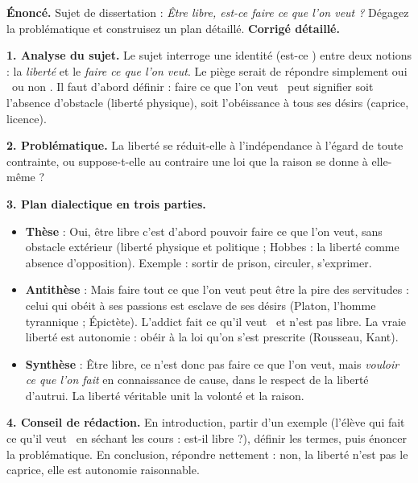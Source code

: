 \documentclass[11pt]{article}
\begin{document}
\begin{exoresolu}
\textbf{Énoncé.} Sujet de dissertation : \emph{Être libre, est-ce faire ce que l'on veut ?} Dégagez la problématique et construisez un plan détaillé.
\tcblower
\textbf{Corrigé détaillé.}

\textbf{1. Analyse du sujet.} Le sujet interroge une identité (\guillemotleft est-ce \guillemotright) entre deux notions : la \emph{liberté} et le \emph{faire ce que l'on veut}. Le piège serait de répondre simplement \guillemotleft oui \guillemotright\ ou \guillemotleft non \guillemotright. Il faut d'abord définir : \guillemotleft faire ce que l'on veut \guillemotright\ peut signifier soit l'absence d'obstacle (liberté physique), soit l'obéissance à tous ses désirs (caprice, licence).

\textbf{2. Problématique.} La liberté se réduit-elle à l'indépendance à l'égard de toute contrainte, ou suppose-t-elle au contraire une loi que la raison se donne à elle-même ?

\textbf{3. Plan dialectique en trois parties.}
\begin{itemize}
\item \textbf{Thèse} : Oui, être libre c'est d'abord pouvoir faire ce que l'on veut, sans obstacle extérieur (liberté physique et politique ; Hobbes : la liberté comme absence d'opposition). Exemple : sortir de prison, circuler, s'exprimer.
\item \textbf{Antithèse} : Mais faire tout ce que l'on veut peut être la pire des servitudes : celui qui obéit à ses passions est esclave de ses désirs (Platon, l'homme tyrannique ; Épictète). L'addict \guillemotleft fait ce qu'il veut \guillemotright\ et n'est pas libre. La vraie liberté est autonomie : obéir à la loi qu'on s'est prescrite (Rousseau, Kant).
\item \textbf{Synthèse} : Être libre, ce n'est donc pas faire ce que l'on veut, mais \emph{vouloir ce que l'on fait} en connaissance de cause, dans le respect de la liberté d'autrui. La liberté véritable unit la volonté et la raison.
\end{itemize}

\textbf{4. Conseil de rédaction.} En introduction, partir d'un exemple (l'élève qui \guillemotleft fait ce qu'il veut \guillemotright\ en séchant les cours : est-il libre ?), définir les termes, puis énoncer la problématique. En conclusion, répondre nettement : non, la liberté n'est pas le caprice, elle est autonomie raisonnable.
\end{exoresolu}
\end{document}
